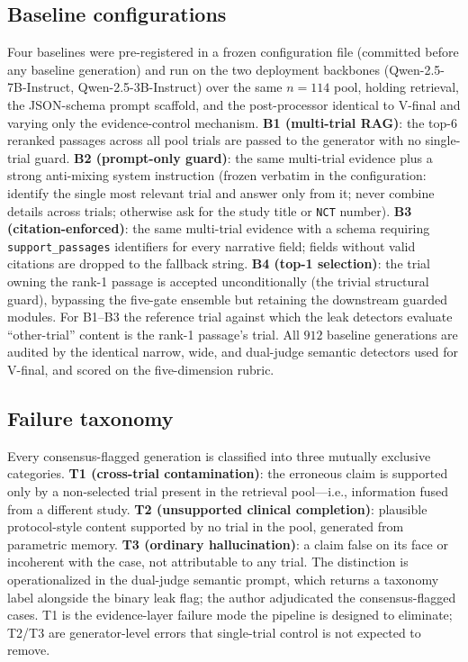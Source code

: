\documentclass[11pt]{article}
\begin{document}
\subsection{Baseline configurations}
\label{sec:methods_baselines}
Four baselines were pre-registered in a frozen configuration file (committed before any baseline generation) and run on the two deployment backbones (Qwen-2.5-7B-Instruct, Qwen-2.5-3B-Instruct) over the same $n=114$ pool, holding retrieval, the JSON-schema prompt scaffold, and the post-processor identical to V-final and varying only the evidence-control mechanism. \textbf{B1 (multi-trial RAG)}: the top-$6$ reranked passages across all pool trials are passed to the generator with no single-trial guard. \textbf{B2 (prompt-only guard)}: the same multi-trial evidence plus a strong anti-mixing system instruction (frozen verbatim in the configuration: identify the single most relevant trial and answer only from it; never combine details across trials; otherwise ask for the study title or \texttt{NCT} number). \textbf{B3 (citation-enforced)}: the same multi-trial evidence with a schema requiring \texttt{support\_passages} identifiers for every narrative field; fields without valid citations are dropped to the fallback string. \textbf{B4 (top-1 selection)}: the trial owning the rank-1 passage is accepted unconditionally (the trivial structural guard), bypassing the five-gate ensemble but retaining the downstream guarded modules. For B1--B3 the reference trial against which the leak detectors evaluate ``other-trial'' content is the rank-1 passage's trial. All $912$ baseline generations are audited by the identical narrow, wide, and dual-judge semantic detectors used for V-final, and scored on the five-dimension rubric.

\subsection{Failure taxonomy}
\label{sec:methods_taxonomy}
Every consensus-flagged generation is classified into three mutually exclusive categories. \textbf{T1 (cross-trial contamination)}: the erroneous claim is supported only by a non-selected trial present in the retrieval pool---i.e., information fused from a different study. \textbf{T2 (unsupported clinical completion)}: plausible protocol-style content supported by no trial in the pool, generated from parametric memory. \textbf{T3 (ordinary hallucination)}: a claim false on its face or incoherent with the case, not attributable to any trial. The distinction is operationalized in the dual-judge semantic prompt, which returns a taxonomy label alongside the binary leak flag; the author adjudicated the consensus-flagged cases. T1 is the evidence-layer failure mode the pipeline is designed to eliminate; T2/T3 are generator-level errors that single-trial control is not expected to remove.
\end{document}
